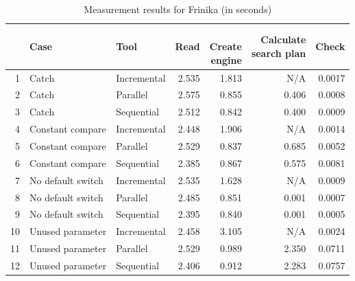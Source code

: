 \begin{table}[!htb]
	\centering
	\begin{tabular}{rllrrrr}
		\hline
		& Case & Tool & Read & \shortstack{\\Create\\engine} & \shortstack{Calculate\\search plan} & Check \\ 
		\hline \hline
		1 & Catch & Incremental & 2.535 & 1.813 & N/A & 0.0017 \\ 
		2 & Catch & Parallel & 2.575 & 0.855 & 0.406 & 0.0008 \\ 
		3 & Catch & Sequential & 2.512 & 0.842 & 0.400 & 0.0009 \\ 
		\hline
		4 & Constant compare & Incremental & 2.448 & 1.906 & N/A & 0.0014 \\ 
		5 & Constant compare & Parallel & 2.529 & 0.837 & 0.685 & 0.0052 \\ 
		6 & Constant compare & Sequential & 2.385 & 0.867 & 0.575 & 0.0081 \\
		\hline 
		7 & No default switch & Incremental & 2.535 & 1.628 & N/A & 0.0009 \\ 
		8 & No default switch & Parallel & 2.485 & 0.851 & 0.001 & 0.0007 \\ 
		9 & No default switch & Sequential & 2.395 & 0.840 & 0.001 & 0.0005 \\ 
		\hline
		10 & Unused parameter & Incremental & 2.458 & 3.105 & N/A & 0.0024 \\ 
		11 & Unused parameter & Parallel & 2.529 & 0.989 & 2.350 & 0.0711 \\ 
		12 & Unused parameter & Sequential & 2.406 & 0.912 & 2.283 & 0.0757 \\ 
		\hline
	\end{tabular}
	\caption{Measurement results for Frinika (in seconds)} 
	\label{tab:frinika}
\end{table}



